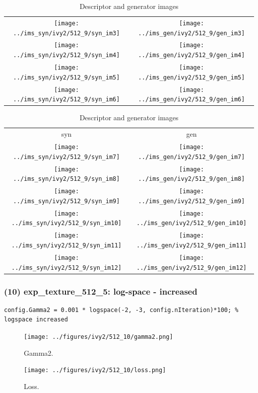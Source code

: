 \documentclass[letter]{article}
\begin{document}
\begin{table}[h!]
\begin{tabular}{cc}
		\texttt{[image: ../ims\_syn/ivy2/512\_9/syn\_im3]} & \texttt{[image: ../ims\_gen/ivy2/512\_9/gen\_im3]} \tabularnewline
		\texttt{[image: ../ims\_syn/ivy2/512\_9/syn\_im4]} & \texttt{[image: ../ims\_gen/ivy2/512\_9/gen\_im4]} \tabularnewline
		\texttt{[image: ../ims\_syn/ivy2/512\_9/syn\_im5]} & \texttt{[image: ../ims\_gen/ivy2/512\_9/gen\_im5]} \tabularnewline
		\texttt{[image: ../ims\_syn/ivy2/512\_9/syn\_im6]} & \texttt{[image: ../ims\_gen/ivy2/512\_9/gen\_im6]} \tabularnewline
	\end{tabular}
	\begin{tabular}{cc}
		syn & gen\tabularnewline
		\texttt{[image: ../ims\_syn/ivy2/512\_9/syn\_im7]} & \texttt{[image: ../ims\_gen/ivy2/512\_9/gen\_im7]} \tabularnewline
		\texttt{[image: ../ims\_syn/ivy2/512\_9/syn\_im8]} & \texttt{[image: ../ims\_gen/ivy2/512\_9/gen\_im8]} \tabularnewline
		\texttt{[image: ../ims\_syn/ivy2/512\_9/syn\_im9]} & \texttt{[image: ../ims\_gen/ivy2/512\_9/gen\_im9]} \tabularnewline
		\texttt{[image: ../ims\_syn/ivy2/512\_9/syn\_im10]} & \texttt{[image: ../ims\_gen/ivy2/512\_9/gen\_im10]} \tabularnewline
		\texttt{[image: ../ims\_syn/ivy2/512\_9/syn\_im11]} & \texttt{[image: ../ims\_gen/ivy2/512\_9/gen\_im11]} \tabularnewline
		\texttt{[image: ../ims\_syn/ivy2/512\_9/syn\_im12]} & \texttt{[image: ../ims\_gen/ivy2/512\_9/gen\_im12]} \tabularnewline
	\end{tabular}
	\caption{Descriptor and generator images}
\end{table}
\newpage

\subsubsection*{(10) exp\_texture\_512\_5: log-space - increased}

\begin{lstlisting}
config.Gamma2 = 0.001 * logspace(-2, -3, config.nIteration)*100; % logspace increased
\end{lstlisting}

\begin{figure}[h!]
	\centering
	\texttt{[image: ../figures/ivy2/512\_10/gamma2.png]}
	\caption{\label{fig:gamma1}Gamma2.}
\end{figure}

\begin{figure}[h!]
	\centering
	\texttt{[image: ../figures/ivy2/512\_10/loss.png]}
	\caption{\label{fig:gamma1}Loss.}
\end{figure}

\newpage
\end{document}
